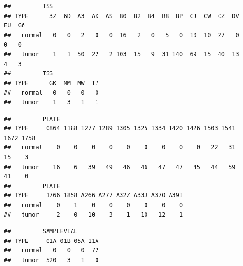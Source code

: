 \documentclass[]{article}
\newenvironment{Shaded}{\begin{snugshade}}{\end{snugshade}}
\newcommand{\KeywordTok}[1]{\textcolor[rgb]{0.13,0.29,0.53}{\textbf{{#1}}}}
\newcommand{\DataTypeTok}[1]{\textcolor[rgb]{0.13,0.29,0.53}{{#1}}}
\newcommand{\NormalTok}[1]{{#1}}
\begin{document}
\begin{verbatim}
##         TSS
## TYPE      3Z  6D  A3  AK  AS  B0  B2  B4  B8  BP  CJ  CW  CZ  DV  EU  G6
##   normal   0   0   2   0   0  16   2   0   5   0  10  10  27   0   0   0
##   tumor    1   1  50  22   2 103  15   9  31 140  69  15  40  13   4   3
##         TSS
## TYPE      GK  MM  MW  T7
##   normal   0   0   0   0
##   tumor    1   3   1   1
\end{verbatim}

\begin{Shaded}
\end{Shaded}

\begin{verbatim}
##         PLATE
## TYPE     0864 1188 1277 1289 1305 1325 1334 1420 1426 1503 1541 1672 1758
##   normal    0    0    0    0    0    0    0    0    0   22   31   15    3
##   tumor    16    6   39   49   46   46   47   47   45   44   59   41    0
##         PLATE
## TYPE     1766 1858 A266 A277 A32Z A33J A37O A39I
##   normal    0    1    0    0    0    0    0    0
##   tumor     2    0   10    3    1   10   12    1
\end{verbatim}

\begin{Shaded}
\end{Shaded}

\begin{verbatim}
##         SAMPLEVIAL
## TYPE     01A 01B 05A 11A
##   normal   0   0   0  72
##   tumor  520   3   1   0
\end{verbatim}

\begin{Shaded}
\end{Shaded}
\end{document}
